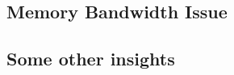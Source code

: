   \subsection{Memory Bandwidth Issue}

  \label{sec:memorybandwidhissue}
  
  
  

  \subsection{Some other insights}
  \label{sec:otherinsights}
